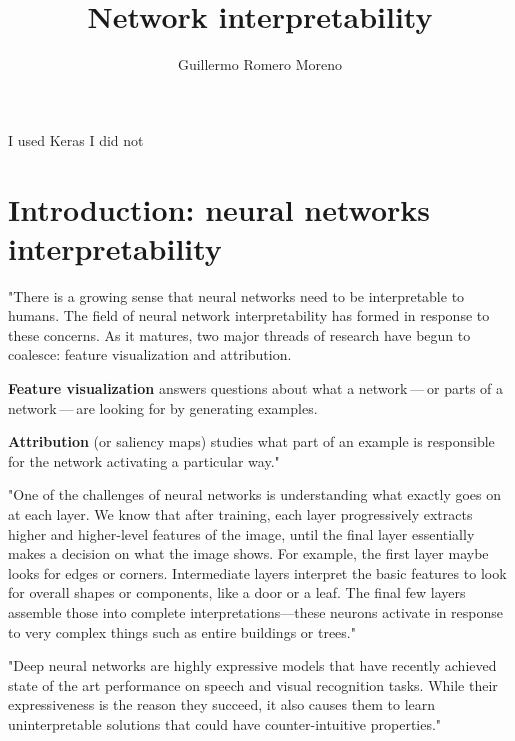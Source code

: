 \documentclass[]{scrartcl}
\title{Network interpretability}
\author{Guillermo Romero Moreno}
\begin{document}
\maketitle

\tableofcontents

\newpage
I used Keras \cite{chollet2015keras}
I did not

\section{Introduction: neural networks interpretability}
"There is a growing sense that neural networks need to be interpretable to humans. The field of neural network interpretability has formed in response to these concerns. As it matures, two major threads of research have begun to coalesce: feature visualization and attribution. 

\textbf{Feature visualization} answers questions about what a network — or parts of a network — are looking for by generating examples.

\textbf{Attribution} (or saliency maps) studies what part of an example is responsible for the network activating a particular way." \cite{Olah2017}

"One of the challenges of neural networks is understanding what exactly goes on at each layer.
We know that after training, each layer progressively extracts higher and higher-level features of the image, until the final layer essentially makes a decision on what the image shows.
For example, the first layer maybe looks for edges or corners.
Intermediate layers interpret the basic features to look for overall shapes or components, like a door or a leaf.
The final few layers assemble those into complete interpretations---these neurons activate in response to very complex things such as entire buildings or trees." \cite{Mordvintsev2015}

"Deep neural networks are highly expressive models that have recently achieved state of the art performance on speech and visual recognition tasks. While their expressiveness is the reason they succeed, it also causes them to learn uninterpretable solutions that could have counter-intuitive properties." \cite{Szegedy2013}
\end{document}
